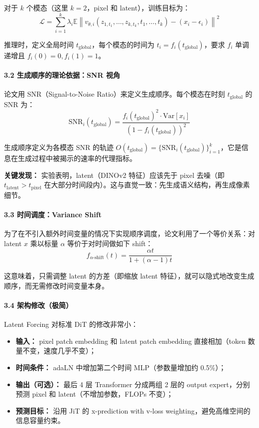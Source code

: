 对于 $k$ 个模态（这里 $k=2$，pixel 和 latent），训练目标为：
$$\mathcal{L} = \sum_{i=1}^{k} \lambda_i \mathbb{E} \left\| v_{\theta,i}(z_{1,t_1}, \ldots, z_{k,t_k}, t_1, \ldots, t_k) - (x_i - \epsilon_i) \right\|^2$$

推理时，定义全局时间 $t_{\text{global}}$，每个模态的时间为 $t_i = f_i(t_{\text{global}})$，要求 $f_i$ 单调递增且 $f_i(0)=0, f_i(1)=1$。

\paragraph{3.2 生成顺序的理论依据：SNR 视角}

论文用 SNR（Signal-to-Noise Ratio）来定义生成顺序。每个模态在时刻 $t_{\text{global}}$ 的 SNR 为：
$$\text{SNR}_i(t_{\text{global}}) = \frac{f_i(t_{\text{global}})^2 \cdot \text{Var}[x_i]}{(1 - f_i(t_{\text{global}}))^2}$$

生成顺序定义为各模态 SNR 的轨迹 $O(t_{\text{global}}) = \{\text{SNR}_i(t_{\text{global}})\}_{i=1}^k$，它是信息在生成过程中被揭示的速率的代理指标。

\begin{warnbox}
\textbf{关键发现：} 实验表明，latent（DINOv2 特征）应该先于 pixel 去噪（即 $t_{\text{latent}} > t_{\text{pixel}}$ 在大部分时间段内）。这与直觉一致：先生成语义结构，再生成像素细节。
\end{warnbox}

\paragraph{3.3 时间调度：Variance Shift}

为了在不引入额外时间变量的情况下实现顺序调度，论文利用了一个等价关系：对 latent $x$ 乘以标量 $\alpha$ 等价于对时间做如下 shift：
$$f_{\alpha\text{-shift}}(t) = \frac{\alpha t}{1 + (\alpha - 1)t}$$

这意味着，只需调整 latent 的方差（即缩放 latent 特征），就可以隐式地改变生成顺序，而无需修改时间变量本身。

\paragraph{3.4 架构修改（极简）}

Latent Forcing 对标准 DiT 的修改非常小：
\begin{itemize}[leftmargin=1.5em]
  \item \textbf{输入：} pixel patch embedding 和 latent patch embedding 直接相加（token 数量不变，速度几乎不变）；
  \item \textbf{时间条件：} adaLN 中增加第二个时间 MLP（参数量增加约 0.5\%）；
  \item \textbf{输出（可选）：} 最后 4 层 Transformer 分成两组 2 层的 output expert，分别预测 pixel 和 latent（不增加参数，FLOPs 不变）；
  \item \textbf{预测目标：} 沿用 JiT 的 x-prediction with v-loss weighting，避免高维空间的信息容量约束。
\end{itemize}


